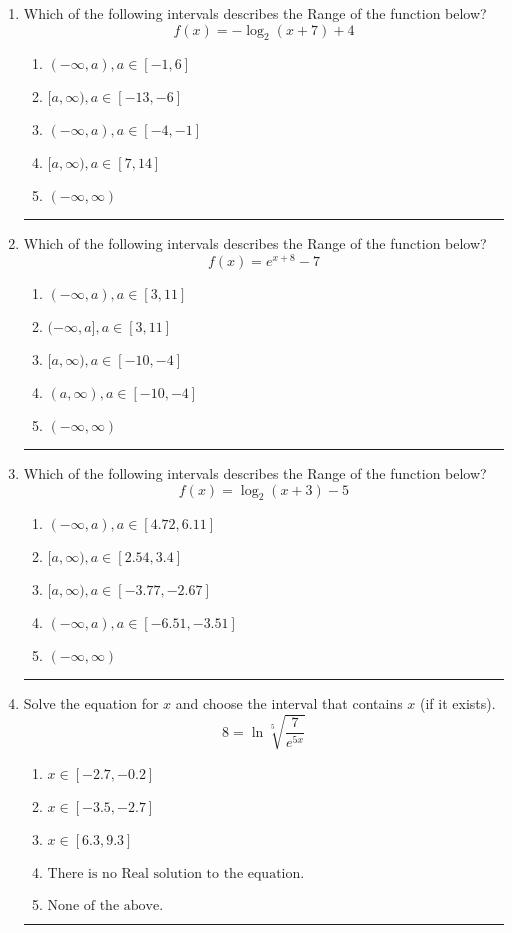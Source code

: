 \documentclass[14pt]{extbook}
\newcommand{\litem}[1]{\item#1\hspace*{-1cm}\rule{\textwidth}{0.4pt}}
\begin{document}
\begin{enumerate}
{\begin{enumerate}[label=\Alph*.]
\end{enumerate} }
\litem{
Which of the following intervals describes the Range of the function below?\[ f(x) = -\log_2{(x+7)}+4 \]\begin{enumerate}[label=\Alph*.]
\item \( (-\infty, a), a \in [-1, 6] \)
\item \( [a, \infty), a \in [-13, -6] \)
\item \( (-\infty, a), a \in [-4, -1] \)
\item \( [a, \infty), a \in [7, 14] \)
\item \( (-\infty, \infty) \)

\end{enumerate} }
\litem{
Which of the following intervals describes the Range of the function below?\[ f(x) = e^{x+8}-7 \]\begin{enumerate}[label=\Alph*.]
\item \( (-\infty, a), a \in [3, 11] \)
\item \( (-\infty, a], a \in [3, 11] \)
\item \( [a, \infty), a \in [-10, -4] \)
\item \( (a, \infty), a \in [-10, -4] \)
\item \( (-\infty, \infty) \)

\end{enumerate} }
\litem{
Which of the following intervals describes the Range of the function below?\[ f(x) = \log_2{(x+3)}-5 \]\begin{enumerate}[label=\Alph*.]
\item \( (-\infty, a), a \in [4.72, 6.11] \)
\item \( [a, \infty), a \in [2.54, 3.4] \)
\item \( [a, \infty), a \in [-3.77, -2.67] \)
\item \( (-\infty, a), a \in [-6.51, -3.51] \)
\item \( (-\infty, \infty) \)

\end{enumerate} }
\litem{
 Solve the equation for $x$ and choose the interval that contains $x$ (if it exists).\[  8 = \ln{\sqrt[5]{\frac{7}{e^{5x}}}} \]\begin{enumerate}[label=\Alph*.]
\item \( x \in [-2.7, -0.2] \)
\item \( x \in [-3.5, -2.7] \)
\item \( x \in [6.3, 9.3] \)
\item \( \text{There is no Real solution to the equation.} \)
\item \( \text{None of the above.} \)


\end{enumerate}}
\end{enumerate}
\end{document}
